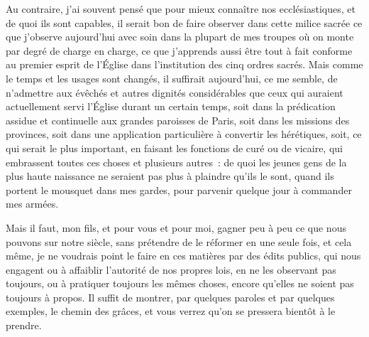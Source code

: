 \documentclass[french,twoside]{book} %
\begin{document}
Au contraire, j’ai souvent pensé que pour mieux connaître nos ecclésiastiques, et de quoi ils sont capables, il serait bon de faire observer dans cette milice sacrée ce que j’observe aujourd’hui avec soin dans la plupart de mes troupes où on monte par degré de charge en charge, ce que j’apprends aussi être tout à fait conforme au premier esprit de l’Église dans l’institution des cinq ordres sacrés. Mais comme le temps et les usages sont changés, il suffirait aujourd’hui, ce me semble, de n’admettre aux évêchés et autres dignités considérables que ceux qui auraient actuellement servi l’Église durant un certain temps, soit dans la prédication assidue et continuelle aux grandes paroisses de Paris, soit dans les missions des provinces, soit dans une application particulière à convertir les hérétiques, soit, ce qui serait le plus important, en faisant les fonctions de curé ou de vicaire, qui embrassent toutes ces choses et plusieurs autres : de quoi les jeunes gens de la plus haute naissance ne seraient pas plus à plaindre qu’ils le sont, quand ils portent le mousquet dans mes gardes, pour parvenir quelque jour à commander mes armées.\par
Mais il faut, mon fils, et pour vous et pour moi, gagner peu à peu ce que nous pouvons sur notre siècle, sans prétendre de le réformer en une seule fois, et cela même, je ne voudrais point le faire en ces matières par des édits publics, qui nous engagent ou à affaiblir l’autorité de nos propres lois, en ne les observant pas toujours, ou à pratiquer toujours les mêmes choses, encore qu’elles ne soient pas toujours à propos. Il suffit de montrer, par quelques paroles et par quelques exemples, le chemin des grâces, et vous verrez qu’on se pressera bientôt à le prendre.
\end{document}
